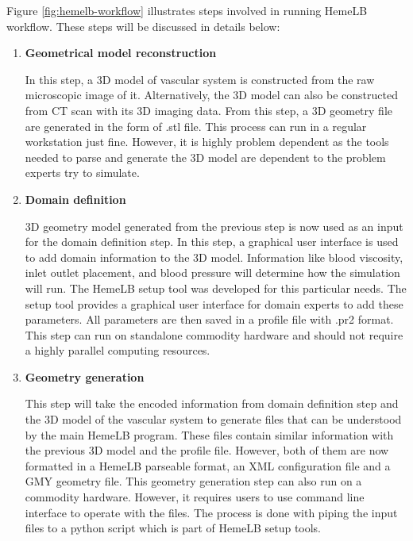\vspace{1cm}


Figure \ref{fig:hemelb-workflow} illustrates steps involved in running HemeLB workflow. These steps will be discussed in details below:

\begin{enumerate}

\item{\textbf{Geometrical model reconstruction}}

In this step, a 3D model of vascular system is constructed from the raw microscopic image of it. Alternatively, the 3D model can also be constructed from CT scan with its 3D imaging data. From this step, a 3D geometry file are generated in the form of .stl file. This process can run in a regular workstation just fine. However, it is highly problem dependent as the tools needed to parse and generate the 3D model are dependent to the problem experts try to simulate.

\item{\textbf{Domain definition}}

3D geometry model generated from the previous step is now used as an input for the domain definition step. In this step, a graphical user interface is used to add domain information to the 3D model. Information like blood viscosity, inlet outlet placement, and blood pressure will determine how the simulation will run. The HemeLB setup tool was developed for this particular needs. The setup tool provides a graphical user interface for domain experts to add these parameters. All parameters are then saved in a profile file with .pr2 format. This step can run on standalone commodity hardware and should not require a highly parallel computing resources.

\item{\textbf{Geometry generation}}

This step will take the encoded information from domain definition step and the 3D model of the vascular system to generate files that can be understood by the main HemeLB program. These files contain similar information with the previous 3D model and the profile file. However, both of them are now formatted in a HemeLB parseable format, an XML configuration file and a GMY geometry file. This geometry generation step can also run on a commodity hardware. However, it requires users to use command line interface to operate with the files. The process is done with piping the input files to a python script which is part of HemeLB setup tools.


\end{enumerate}
